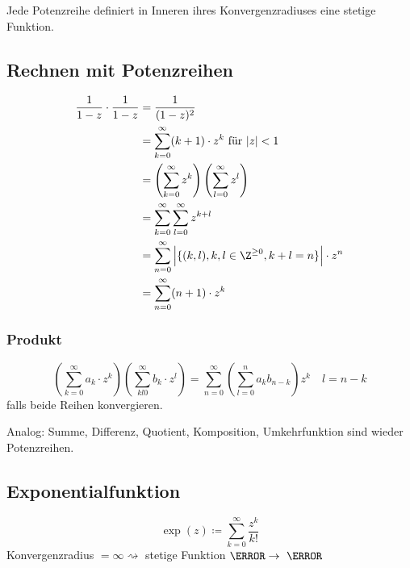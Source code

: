 \begin{fakt}
	Jede Potenzreihe definiert in Inneren ihres Konvergenzradiuses eine stetige Funktion.
\end{fakt}

\subsection{Rechnen mit Potenzreihen}
\begin{align*}
	\frac{1}{1-z} \cdot \frac{1}{1-z}	&= \frac{1}{(1-z)^2} \\
							&= \sum_{k=0}^\infty (k+1) \cdot z^k \text{ für } \abs{z} < 1 \\
							&= \left( \sum_{k=0}^\infty z^k \right) \left( \sum_{l=0}^\infty z^l \right) \\
							&= \sum_{k=0}^\infty \sum_{l=0}^\infty z^{k+l} \\
							&= \sum_{n=0}^\infty \abs{\{ (k,l) , k, l \in \Z^{\geq 0}, k + l = n \}} \cdot z^n \\
							&= \sum_{n=0}^\infty (n+1) \cdot z^k
\end{align*}

\subsubsection{Produkt}
\[ \left( \sum_{k=0}^\infty a_k \cdot z^k \right) \left( \sum_{kl0}^\infty b_k \cdot z^l \right) = \sum_{n=0}^\infty \left( \sum_{l=0}^n a_k b_{n-k} \right) z^k \quad l = n - k \]
falls beide Reihen konvergieren.

Analog: Summe, Differenz, Quotient, Komposition, Umkehrfunktion sind wieder Potenzreihen.

\subsection{Exponentialfunktion}
\[ \exp(z) \coloneqq \sum_{k=0}^\infty \frac{z^k}{k!} \]
Konvergenzradius $= \infty \rightsquigarrow$ stetige Funktion $\C \rightarrow \C$

